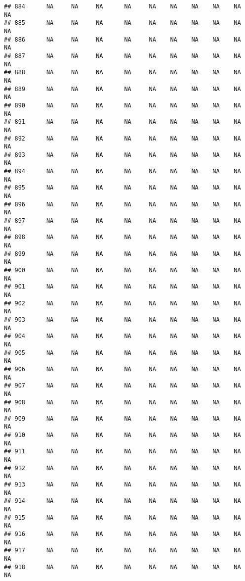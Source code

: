 \documentclass{article}\usepackage{graphicx, color}
\makeatletter
\newenvironment{kframe}{%
 \def\at@end@of@kframe{}%
 \ifinner\ifhmode%
  \def\at@end@of@kframe{\end{minipage}}%
  \begin{minipage}{\columnwidth}%
 \fi\fi%
 \def\FrameCommand##1{\hskip\@totalleftmargin \hskip-\fboxsep
 \colorbox{shadecolor}{##1}\hskip-\fboxsep
     \hskip-\linewidth \hskip-\@totalleftmargin \hskip\columnwidth}%
 \MakeFramed {\advance\hsize-\width
   \@totalleftmargin\z@ \linewidth\hsize
   \@setminipage}}%
 {\par\unskip\endMakeFramed%
 \at@end@of@kframe}
\newenvironment{knitrout}{}{} %
\makeatother
\begin{document}
\begin{knitrout}
\begin{kframe}
\begin{verbatim}
## 884      NA     NA     NA      NA     NA    NA    NA    NA    NA     NA
## 885      NA     NA     NA      NA     NA    NA    NA    NA    NA     NA
## 886      NA     NA     NA      NA     NA    NA    NA    NA    NA     NA
## 887      NA     NA     NA      NA     NA    NA    NA    NA    NA     NA
## 888      NA     NA     NA      NA     NA    NA    NA    NA    NA     NA
## 889      NA     NA     NA      NA     NA    NA    NA    NA    NA     NA
## 890      NA     NA     NA      NA     NA    NA    NA    NA    NA     NA
## 891      NA     NA     NA      NA     NA    NA    NA    NA    NA     NA
## 892      NA     NA     NA      NA     NA    NA    NA    NA    NA     NA
## 893      NA     NA     NA      NA     NA    NA    NA    NA    NA     NA
## 894      NA     NA     NA      NA     NA    NA    NA    NA    NA     NA
## 895      NA     NA     NA      NA     NA    NA    NA    NA    NA     NA
## 896      NA     NA     NA      NA     NA    NA    NA    NA    NA     NA
## 897      NA     NA     NA      NA     NA    NA    NA    NA    NA     NA
## 898      NA     NA     NA      NA     NA    NA    NA    NA    NA     NA
## 899      NA     NA     NA      NA     NA    NA    NA    NA    NA     NA
## 900      NA     NA     NA      NA     NA    NA    NA    NA    NA     NA
## 901      NA     NA     NA      NA     NA    NA    NA    NA    NA     NA
## 902      NA     NA     NA      NA     NA    NA    NA    NA    NA     NA
## 903      NA     NA     NA      NA     NA    NA    NA    NA    NA     NA
## 904      NA     NA     NA      NA     NA    NA    NA    NA    NA     NA
## 905      NA     NA     NA      NA     NA    NA    NA    NA    NA     NA
## 906      NA     NA     NA      NA     NA    NA    NA    NA    NA     NA
## 907      NA     NA     NA      NA     NA    NA    NA    NA    NA     NA
## 908      NA     NA     NA      NA     NA    NA    NA    NA    NA     NA
## 909      NA     NA     NA      NA     NA    NA    NA    NA    NA     NA
## 910      NA     NA     NA      NA     NA    NA    NA    NA    NA     NA
## 911      NA     NA     NA      NA     NA    NA    NA    NA    NA     NA
## 912      NA     NA     NA      NA     NA    NA    NA    NA    NA     NA
## 913      NA     NA     NA      NA     NA    NA    NA    NA    NA     NA
## 914      NA     NA     NA      NA     NA    NA    NA    NA    NA     NA
## 915      NA     NA     NA      NA     NA    NA    NA    NA    NA     NA
## 916      NA     NA     NA      NA     NA    NA    NA    NA    NA     NA
## 917      NA     NA     NA      NA     NA    NA    NA    NA    NA     NA
## 918      NA     NA     NA      NA     NA    NA    NA    NA    NA     NA

\end{verbatim}
\end{kframe}
\end{knitrout}
\end{document}

